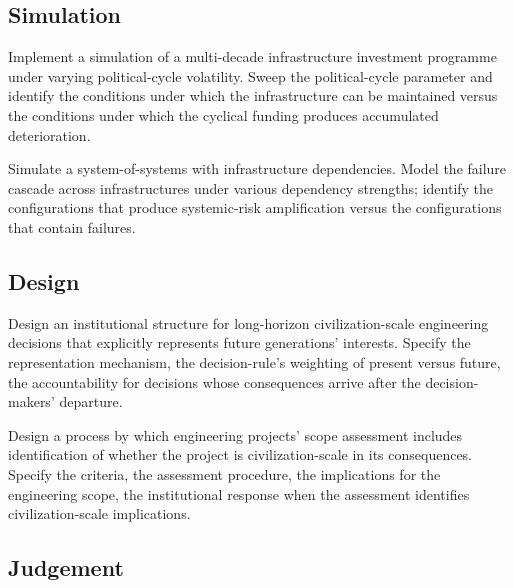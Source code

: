 \subsection*{Simulation}

\begin{exercise}
Implement a simulation of a multi-decade infrastructure investment programme under varying political-cycle volatility. Sweep the political-cycle parameter and identify the conditions under which the infrastructure can be maintained versus the conditions under which the cyclical funding produces accumulated deterioration.
\end{exercise}

\begin{exercise}
Simulate a system-of-systems with infrastructure dependencies. Model the failure cascade across infrastructures under various dependency strengths; identify the configurations that produce systemic-risk amplification versus the configurations that contain failures.
\end{exercise}

\subsection*{Design}

\begin{exercise}
Design an institutional structure for long-horizon civilization-scale engineering decisions that explicitly represents future generations' interests. Specify the representation mechanism, the decision-rule's weighting of present versus future, the accountability for decisions whose consequences arrive after the decision-makers' departure.
\end{exercise}

\begin{exercise}
Design a process by which engineering projects' scope assessment includes identification of whether the project is civilization-scale in its consequences. Specify the criteria, the assessment procedure, the implications for the engineering scope, the institutional response when the assessment identifies civilization-scale implications.
\end{exercise}

\subsection*{Judgement}

